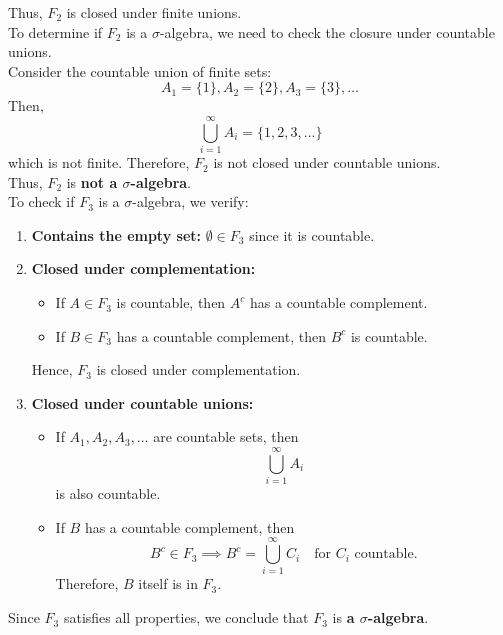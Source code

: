 \begin{solution}
Thus, \(F_2\) is closed under finite unions.\\

To determine if \(F_2\) is a \(\sigma\)-algebra, we need to check the closure under countable unions.\\

Consider the countable union of finite sets:
\[
A_1 = \{1\}, A_2 = \{2\}, A_3 = \{3\}, \ldots
\]
Then,
\[
\bigcup_{i=1}^{\infty} A_i = \{1, 2, 3, \ldots\}
\]
which is not finite. Therefore, \(F_2\) is not closed under countable unions.\\

Thus, \(F_2\) is \textbf{not a \(\sigma\)-algebra}.\\

To check if \(F_3\) is a \(\sigma\)-algebra, we verify:

\begin{enumerate}
    \item \textbf{Contains the empty set:} \(\emptyset \in F_3\) since it is countable.

    \item \textbf{Closed under complementation:}
    \begin{itemize}
        \item If \(A \in F_3\) is countable, then \(A^c\) has a countable complement.
        \item If \(B \in F_3\) has a countable complement, then \(B^c\) is countable.
    \end{itemize}
    Hence, \(F_3\) is closed under complementation.

    \item \textbf{Closed under countable unions:}
    \begin{itemize}
        \item If \(A_1, A_2, A_3, \ldots\) are countable sets, then
        \[
        \bigcup_{i=1}^{\infty} A_i
        \]
        is also countable.
        \item If \(B\) has a countable complement, then
        \[
        B^c \in F_3 \implies B^c = \bigcup_{i=1}^{\infty} C_i \quad \text{for } C_i \text{ countable}.
        \]
        Therefore, \(B\) itself is in \(F_3\).
    \end{itemize}
\end{enumerate}

Since \(F_3\) satisfies all properties, we conclude that \(F_3\) is \textbf{a \(\sigma\)-algebra}.\\
\end{solution}

